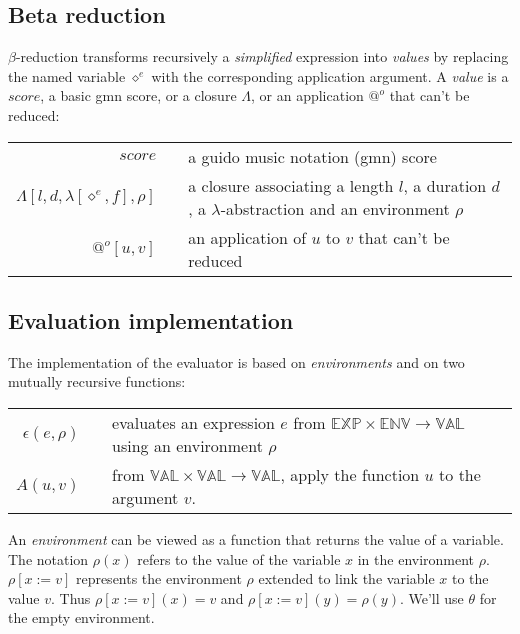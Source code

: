 \documentclass[10pt,a4paper,frenchb]{article}
\makeatletter
\newcommand{\var}[1]{\diamond^#1}
\newcommand{\expr}{\mathbb{EXP}}
\newcommand{\val}{\mathbb{VAL}}
\newcommand{\env}{\mathbb{ENV}}
\newcommand{\closure}{\Lambda}
\newcommand{\noredex}{@^o}
\newcommand{\f}[3]{$#1 \times #2 \rightarrow #3$}
\newcommand{\evalsym}{\epsilon}
\newcommand{\eval}[1]{\evalsym(#1,\rho)}
\newcommand{\envsym}{\rho}
\newcommand{\emptyenv}{\theta}
\newcommand{\closenv}[4][\var{e}]{\closure[#3,#4,\lambda[#1,#2],\envsym]}
\makeatother
\begin{document}
\subsection{Beta reduction}

$\beta$-reduction transforms recursively a \emph{simplified} expression into \emph{values} by replacing the named variable $\var{e}$ with the corresponding application argument. A \emph{value} is a $score$, a basic gmn score, or a closure $\closure$, or an application $\noredex$ that can't be reduced:
\begin{center}
\begin{tabular}{rc@{ : }l}
 $score$				& & a guido music notation (gmn) score \\
 $\closenv{f}{l}{d}$ 	& & a closure associating a length $l$, a duration $d$, a $\lambda$-abstraction and an environment $\envsym$ \\
 $\noredex[u,v]$ 		& & an application of $u$ to $v$ that can't be reduced \\
\end{tabular}
\end{center}


\subsection{Evaluation implementation}

The implementation of the evaluator is based on \emph{environments} and on two mutually recursive functions:
\begin{center}
\begin{tabular}{rc@{ : }l}
$\eval{e}$ & & evaluates an expression $e$ from \f{\expr}{\env}{\val} using an environment $\envsym$ \\
$A(u,v)$  & & from \f{\val}{\val}{\val}, apply the function $u$ to the argument $v$. \\
\end{tabular}
\end{center}


An \emph{environment} can be viewed as a function that returns the value of a variable. The notation $\envsym(x)$ refers to the value of the variable $x$ in the environment $\envsym$. $\envsym[x := v]$ represents the environment $\envsym$ extended to link the variable $x$ to the value $v$. Thus $\envsym[x := v](x) = v$ and $\envsym[x := v](y) = \envsym(y)$. We'll use $\emptyenv $ for the empty environment.
\end{document}
